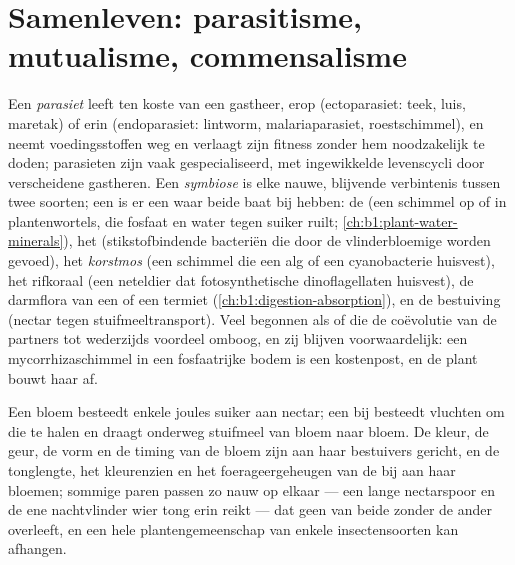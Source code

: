 \section{Samenleven: parasitisme, mutualisme, commensalisme}

\begin{definition}\label{def:b1:species-interactions:symbiosis}
Een \emph{parasiet} leeft ten koste van een gastheer, erop (ectoparasiet:
teek, luis, maretak) of erin (endoparasiet: lintworm, malariaparasiet,
roestschimmel), en neemt voedingsstoffen weg en verlaagt zijn fitness zonder
hem noodzakelijk te doden; parasieten zijn vaak gespecialiseerd, met
ingewikkelde levenscycli door verscheidene gastheren. Een \emph{symbiose} is
elke nauwe, blijvende verbintenis tussen twee soorten; een \emph{}
is er een waar beide baat bij hebben: de  (een schimmel op of in
plantenwortels, die fosfaat en water tegen suiker ruilt;
\cref{ch:b1:plant-water-minerals}), het  (stikstofbindende
bacteriën die door de vlinderbloemige worden gevoed), het \emph{korstmos}
(een schimmel die een alg of een cyanobacterie huisvest), het rifkoraal (een
neteldier dat fotosynthetische dinoflagellaten huisvest), de darmflora van
een  of een termiet (\cref{ch:b1:digestion-absorption}), en de
bestuiving (nectar tegen stuifmeeltransport). Veel  begonnen als
 of  die de coëvolutie van de partners tot wederzijds
voordeel omboog, en zij blijven voorwaardelijk: een mycorrhizaschimmel in
een fosfaatrijke bodem is een kostenpost, en de plant bouwt haar af.
\end{definition}

\begin{example}\label{ex:b1:species-interactions:pollination}
Een bloem besteedt enkele joules suiker aan nectar; een bij besteedt vluchten
om die te halen en draagt onderweg stuifmeel van bloem naar bloem. De kleur,
de geur, de vorm en de timing van de bloem zijn aan haar bestuivers gericht,
en de tonglengte, het kleurenzien en het foerageergeheugen van de bij aan
haar bloemen; sommige paren passen zo nauw op elkaar --- een lange
nectarspoor en de ene nachtvlinder wier tong erin reikt --- dat geen van
beide zonder de ander overleeft, en een hele plantengemeenschap van enkele
insectensoorten kan afhangen.
\end{example}

